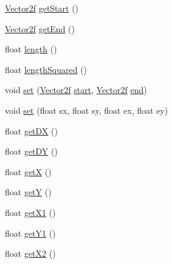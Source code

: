 \begin{DoxyCompactItemize}
\item 
\mbox{\hyperlink{classorg_1_1newdawn_1_1slick_1_1geom_1_1_vector2f}{Vector2f}} \mbox{\hyperlink{classorg_1_1newdawn_1_1slick_1_1geom_1_1_line_a72b20ba9c13c431dd217f9a27ff79896}{get\+Start}} ()
\item 
\mbox{\hyperlink{classorg_1_1newdawn_1_1slick_1_1geom_1_1_vector2f}{Vector2f}} \mbox{\hyperlink{classorg_1_1newdawn_1_1slick_1_1geom_1_1_line_ab88fb2bae52abe065bae0501817d585a}{get\+End}} ()
\item 
float \mbox{\hyperlink{classorg_1_1newdawn_1_1slick_1_1geom_1_1_line_aae00113aea8d0d253962614a873f05a1}{length}} ()
\item 
float \mbox{\hyperlink{classorg_1_1newdawn_1_1slick_1_1geom_1_1_line_a123865d09aee1331de18b4263f5f5157}{length\+Squared}} ()
\item 
void \mbox{\hyperlink{classorg_1_1newdawn_1_1slick_1_1geom_1_1_line_ae8ef21c06c220edb4f1e28c44ae8dca7}{set}} (\mbox{\hyperlink{classorg_1_1newdawn_1_1slick_1_1geom_1_1_vector2f}{Vector2f}} \mbox{\hyperlink{classorg_1_1newdawn_1_1slick_1_1geom_1_1_line_aaf3a6c6053990b96a501b80081258f92}{start}}, \mbox{\hyperlink{classorg_1_1newdawn_1_1slick_1_1geom_1_1_vector2f}{Vector2f}} \mbox{\hyperlink{classorg_1_1newdawn_1_1slick_1_1geom_1_1_line_abc89f3da558e2d29ad48f3c453c25f92}{end}})
\item 
void \mbox{\hyperlink{classorg_1_1newdawn_1_1slick_1_1geom_1_1_line_adf969432622d9affe1d0ecd810236f8a}{set}} (float sx, float sy, float ex, float ey)
\item 
float \mbox{\hyperlink{classorg_1_1newdawn_1_1slick_1_1geom_1_1_line_aa8fc8fa94f5d9916cd5a84eea572185f}{get\+DX}} ()
\item 
float \mbox{\hyperlink{classorg_1_1newdawn_1_1slick_1_1geom_1_1_line_a59e779e96e6d5dd2095abf4ed4abb5ce}{get\+DY}} ()
\item 
float \mbox{\hyperlink{classorg_1_1newdawn_1_1slick_1_1geom_1_1_line_a53b6f1c87a3f6f7b3d428cc752863812}{getX}} ()
\item 
float \mbox{\hyperlink{classorg_1_1newdawn_1_1slick_1_1geom_1_1_line_a51500ef16d5815ffb73288ba550567c7}{getY}} ()
\item 
float \mbox{\hyperlink{classorg_1_1newdawn_1_1slick_1_1geom_1_1_line_abebfc0375201e6d648fd559c9c96e6ee}{get\+X1}} ()
\item 
float \mbox{\hyperlink{classorg_1_1newdawn_1_1slick_1_1geom_1_1_line_a2f4636a722a94d4f7f458cb8d757e076}{get\+Y1}} ()
\item 
float \mbox{\hyperlink{classorg_1_1newdawn_1_1slick_1_1geom_1_1_line_a3c1e716e9f47d052d6f54bb60ba421a2}{get\+X2}} ()

\end{DoxyCompactItemize}
